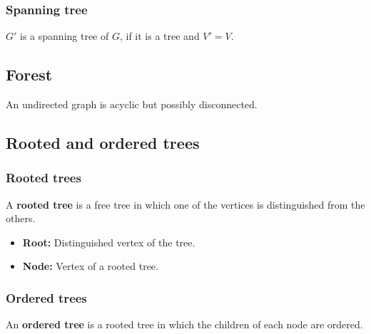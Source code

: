     \subsubsection{Spanning tree}
    \begin{definition}
        $G'$ is a spanning tree of $G$, if it is a tree and $V'=V$.
    \end{definition}

\subsection{Forest}
    \begin{definition}
        An undirected graph is acyclic but possibly disconnected.
    \end{definition}


\subsection{Rooted and ordered trees}
    \subsubsection{Rooted trees}
    \begin{definition}
        A \textbf{rooted tree} is a free tree in which one of the vertices is distinguished from the others.
        \begin{itemize}
            \item \textbf{Root:} Distinguished vertex of the tree.
            \item \textbf{Node:} Vertex of a rooted tree.
        \end{itemize}
    \end{definition}
    
    \subsubsection{Ordered trees}
    \begin{definition}
        An \textbf{ordered tree} is a rooted tree in which the children of each node are ordered.
    \end{definition}


